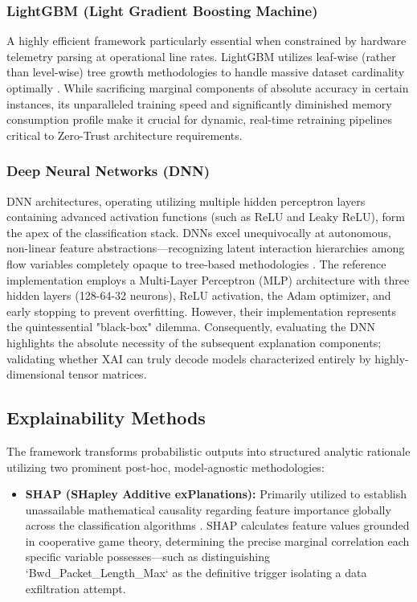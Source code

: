 \documentclass[conference]{IEEEtran}
\begin{document}
\subsubsection{LightGBM (Light Gradient Boosting Machine)}
A highly efficient framework particularly essential when constrained by hardware telemetry parsing at operational line rates. LightGBM utilizes leaf-wise (rather than level-wise) tree growth methodologies to handle massive dataset cardinality optimally \cite{wang2021explainable}. While sacrificing marginal components of absolute accuracy in certain instances, its unparalleled training speed and significantly diminished memory consumption profile make it crucial for dynamic, real-time retraining pipelines critical to Zero-Trust architecture requirements.

\subsubsection{Deep Neural Networks (DNN)}
DNN architectures, operating utilizing multiple hidden perceptron layers containing advanced activation functions (such as ReLU and Leaky ReLU), form the apex of the classification stack. DNNs excel unequivocally at autonomous, non-linear feature abstractions—recognizing latent interaction hierarchies among flow variables completely opaque to tree-based methodologies \cite{lundberg2017unified}. The reference implementation employs a Multi-Layer Perceptron (MLP) architecture with three hidden layers (128-64-32 neurons), ReLU activation, the Adam optimizer, and early stopping to prevent overfitting. However, their implementation represents the quintessential "black-box" dilemma. Consequently, evaluating the DNN highlights the absolute necessity of the subsequent explanation components; validating whether XAI can truly decode models characterized entirely by highly-dimensional tensor matrices.

\subsection{Explainability Methods}

The framework transforms probabilistic outputs into structured analytic rationale utilizing two prominent post-hoc, model-agnostic methodologies:

\begin{itemize}
\item \textbf{SHAP (SHapley Additive exPlanations):} Primarily utilized to establish unassailable mathematical causality regarding feature importance globally across the classification algorithms \cite{ribeiro2016should, stafford2020zero}. SHAP calculates feature values grounded in cooperative game theory, determining the precise marginal correlation each specific variable possesses—such as distinguishing `Bwd\_Packet\_Length\_Max` as the definitive trigger isolating a data exfiltration attempt.
\end{itemize}
\end{document}
